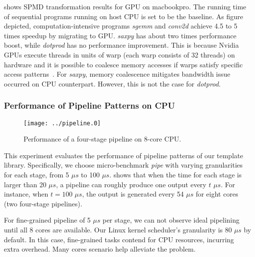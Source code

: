  shows SPMD transformation results for GPU on
macbookpro. The running time of sequential programs running on host CPU is set to
be the baseline.
As figure depicted,  computation-intensive programs
\textit{sgemm} and \textit{conv2d} achieve 4.5 to 5 times speedup
by migrating to GPU.
\textit{saxpy} has about two times performance boost, while \textit{dotprod}
has no performance improvement. This is because
Nvidia GPUs execute threads in units of warp (each warp consists of 32 threads) on hardware and it is
possible to coalesce memory accesses if warps satisfy
specific access patterns~\cite{nvopencl}. For \textit{saxpy}, memory coalescence
mitigates bandwidth issue occurred on CPU counterpart. However, this is not
the case for \textit{dotprod}.

\subsubsection{Performance of Pipeline Patterns on CPU}
\label{exp:4}

\begin{figure}[htp]
\texttt{[image: ../pipeline.0]}
\caption{Performance of a four-stage pipeline on 8-core CPU.}
\label{fig:pipe}
\end{figure}

This experiment evaluates the performance of pipeline patterns of our template
library. Specifically, we choose micro-benchmark \textit{pipe} with varying
granularities for each stage, from 5 $\mu s$ to 100 $\mu s$.  shows
that when the time for each stage is larger than 20 $\mu s$, a pipeline can
roughly produce one output every $t$ $\mu s$. For instance, when $t=100$ $\mu s$,
the output is generated every 54 $\mu s$ for eight cores (two four-stage pipelines).

For fine-grained pipeline of 5 $\mu s$ per stage, we can not observe ideal pipelining until all 8
cores are available.  Our Linux kernel scheduler's granularity is 80
$\mu s$ by default. In this case, fine-grained tasks contend for
CPU resources, incurring extra overhead. Many cores scenario help alleviate the
problem.

